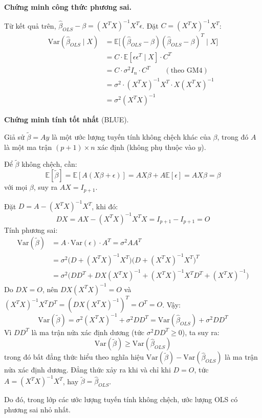 \documentclass[a4paper]{article}
\begin{document}
\textbf{Chứng minh công thức phương sai.}

Từ kết quả trên, $\hat{\beta}_{OLS} - \beta = (X^TX)^{-1}X^T\epsilon$. Đặt $C = (X^TX)^{-1}X^T$:
\begin{align*}
\text{Var}(\hat{\beta}_{OLS} \mid X) &= \mathbb{E}\bigl[(\hat{\beta}_{OLS} - \beta)(\hat{\beta}_{OLS} - \beta)^T \mid X\bigr] \\
&= C \cdot \mathbb{E}[\epsilon\epsilon^T \mid X] \cdot C^T \\
&= C \cdot \sigma^2 I_n \cdot C^T \qquad (\text{theo GM4}) \\
&= \sigma^2 \cdot (X^TX)^{-1}X^T \cdot X(X^TX)^{-1} \\
&= \sigma^2 (X^TX)^{-1}
\end{align*}

\textbf{Chứng minh tính tốt nhất} (BLUE).

Giả sử $\tilde{\beta} = Ay$ là một ước lượng tuyến tính không chệch khác của $\beta$, trong đó $A$ là một ma trận $(p+1) \times n$ xác định (không phụ thuộc vào $y$).

Để $\tilde{\beta}$ không chệch, cần:
$$\mathbb{E}[\tilde{\beta}] = \mathbb{E}[A(X\beta + \epsilon)] = AX\beta + A\mathbb{E}[\epsilon] = AX\beta = \beta$$
với mọi $\beta$, suy ra $AX = I_{p+1}$.

Đặt $D = A - (X^TX)^{-1}X^T$, khi đó:
$$DX = AX - (X^TX)^{-1}X^TX = I_{p+1} - I_{p+1} = O$$
Tính phương sai:
\begin{align*}
\text{Var}(\tilde{\beta}) &= A \cdot \text{Var}(\epsilon) \cdot A^T = \sigma^2 AA^T \\
&= \sigma^2 \bigl(D + (X^TX)^{-1}X^T\bigr)\bigl(D + (X^TX)^{-1}X^T\bigr)^T \\
&= \sigma^2 \bigl(DD^T + D X(X^TX)^{-1} + (X^TX)^{-1}X^TD^T + (X^TX)^{-1}\bigr)
\end{align*}
Do $DX = O$, nên $D X(X^TX)^{-1} = O$ và $(X^TX)^{-1}X^TD^T = (DX(X^TX)^{-1})^T = O^T = O$. Vậy:
$$\text{Var}(\tilde{\beta}) = \sigma^2(X^TX)^{-1} + \sigma^2 DD^T = \text{Var}(\hat{\beta}_{OLS}) + \sigma^2 DD^T$$
Vì $DD^T$ là ma trận nửa xác định dương (tức $\sigma^2 DD^T \geq 0$), ta suy ra:
$$\text{Var}(\tilde{\beta}) \geq \text{Var}(\hat{\beta}_{OLS})$$
trong đó bất đẳng thức hiểu theo nghĩa hiệu $\text{Var}(\tilde{\beta}) - \text{Var}(\hat{\beta}_{OLS})$ là ma trận nửa xác định dương. Đẳng thức xảy ra khi và chỉ khi $D = O$, tức $A = (X^TX)^{-1}X^T$, hay $\tilde{\beta} = \hat{\beta}_{OLS}$.

Do đó, trong lớp các ước lượng tuyến tính không chệch, ước lượng OLS có phương sai nhỏ nhất.
\end{document}
